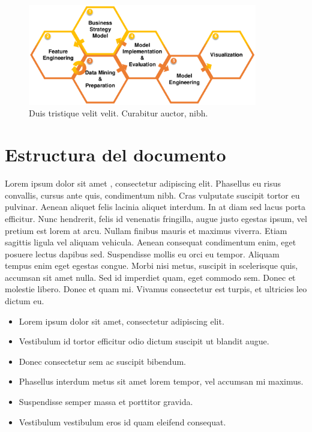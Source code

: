 \begin{figure}[h]
    \centering
    \captionsetup{width=10cm}
    \includegraphics[width=10cm]{contenido/imagenes/DDSD.pdf}
    \caption{Duis tristique velit velit. Curabitur auctor, nibh.}
    \label{fig:figure1}
\end{figure}

\section{Estructura del documento}\label{sec:estructura}
Lorem ipsum dolor sit amet \cite{entry2013one}, consectetur adipiscing elit. Phasellus eu risus convallis, cursus ante quis, condimentum nibh. Cras vulputate suscipit tortor eu pulvinar. Aenean aliquet felis lacinia aliquet interdum. In at diam sed lacus porta efficitur. Nunc hendrerit, felis id venenatis fringilla, augue justo egestas ipsum, vel pretium est lorem at arcu. Nullam finibus mauris et maximus viverra. Etiam sagittis ligula vel aliquam vehicula. Aenean consequat condimentum enim, eget posuere lectus dapibus sed. Suspendisse mollis  eu orci eu tempor. Aliquam tempus enim eget egestas congue. Morbi nisi metus, suscipit in scelerisque quis, accumsan sit amet nulla. Sed id imperdiet quam, eget commodo sem. Donec et molestie libero. Donec et quam mi. Vivamus consectetur est turpis, et ultricies leo dictum eu.\par

\begin{itemize}
    \item Lorem ipsum dolor sit amet, consectetur adipiscing elit.
    \item Vestibulum id tortor efficitur odio dictum suscipit ut blandit augue.
    \item Donec consectetur sem ac suscipit bibendum.
    \item Phasellus interdum metus sit amet lorem tempor, vel accumsan mi maximus.
    \item Suspendisse semper massa et porttitor gravida.
    \item Vestibulum vestibulum eros id quam eleifend consequat.
\end{itemize}{}

    

